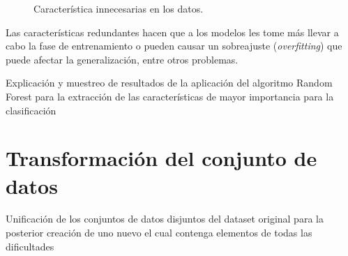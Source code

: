 \begin{figure}[t]
    \centering

    \caption{Característica innecesarias en los datos.}
    \label{fig:redundant}
\end{figure}

Las características redundantes hacen que a los modelos les tome más llevar a cabo la fase de entrenamiento o pueden causar un sobreajuste (\textit{overfitting}) que puede afectar la generalización, entre otros problemas\cite{tuv2009feature}.

Explicación y muestreo de resultados de la aplicación del algoritmo Random Forest para la extracción de las características de mayor importancia para la clasificación

\section{Transformación del conjunto de datos}
Unificación de los conjuntos de datos disjuntos del dataset original para la posterior creación de uno nuevo el cual contenga elementos de todas las dificultades

